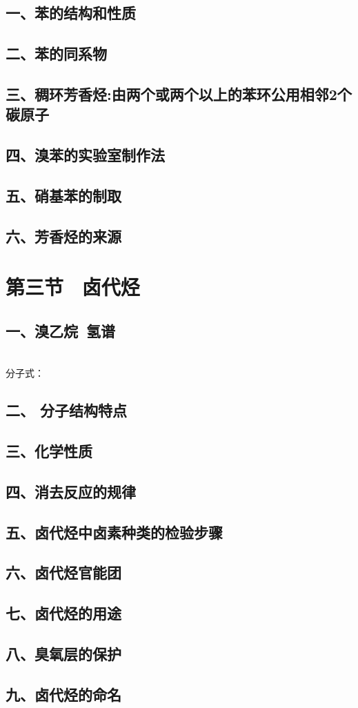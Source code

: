 \documentclass{book}
\begin{document}
\subsection{一、苯的结构和性质}

\subsection{二、苯的同系物}

\subsection{三、稠环芳香烃:由两个或两个以上的苯环公用相邻2个碳原子}

\subsection{四、溴苯的实验室制作法}

\subsection{五、\textbf{硝基苯}的制取}

\subsection{六、芳香烃的来源}

\section{第三节 \ 卤代烃}

\subsection{一、溴乙烷\ 氢谱 }
 \quad {}  \\

分子式：

\subsection{二、 分子结构特点}
\subsection{三、化学性质 }
\subsection{四、消去反应的规律 }
\subsection{五、卤代烃中卤素种类的检验步骤 }
\subsection{六、卤代烃官能团}
\subsection{七、卤代烃的用途}
\subsection{八、臭氧层的保护}
\subsection{九、卤代烃的命名}
\end{document}
